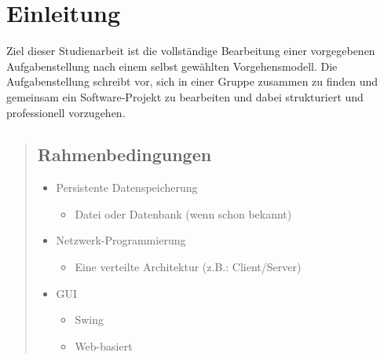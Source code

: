 \chapter{Einleitung}
Ziel dieser Studienarbeit ist die vollständige Bearbeitung einer vorgegebenen Aufgabenstellung nach einem selbst gewählten Vorgehensmodell. Die Aufgabenstellung schreibt vor, sich in einer Gruppe zusammen zu finden und gemeinsam ein Software-Projekt zu bearbeiten und dabei strukturiert und professionell vorzugehen.
\begin{quote}
    \section{Rahmenbedingungen}
    \renewcommand{\labelitemi}{•}
    \begin{itemize}
        \item Persistente Datenspeicherung
        \begin{itemize}
	    \item Datei oder Datenbank (wenn schon bekannt)
        \end{itemize}
        \item Netzwerk-Programmierung
        \begin{itemize}
	    \item Eine verteilte Architektur (z.B.: Client/Server)
        \end{itemize}
        \item GUI
        \begin{itemize}
	    \item Swing
	    \item Web-basiert
        \end{itemize}
    \end{itemize}

\end{quote}
